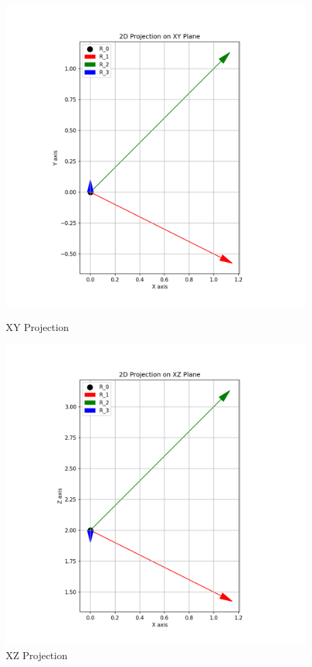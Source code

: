 \begin{figure}[H]
    \centering
    \begin{minipage}{0.48\textwidth}
        \centering
        \includegraphics[width=\textwidth]{figures/custom2_xy.png}
        \caption*{XY Projection}
    \end{minipage}\hfill
    \begin{minipage}{0.48\textwidth}
        \centering
        \includegraphics[width=\textwidth]{figures/custom2_xz.png}
        \caption*{XZ Projection}
    \end{minipage}
    

\end{figure}
